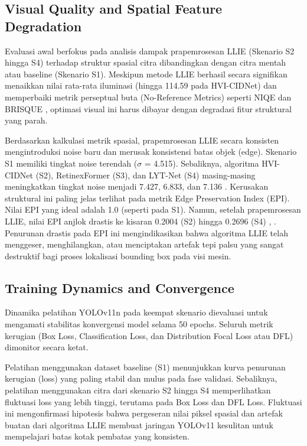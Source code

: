 ﻿\documentclass[conference]{IEEEtran}
\begin{document}
\subsection{Visual Quality and Spatial Feature Degradation} Evaluasi awal berfokus pada analisis dampak prapemrosesan LLIE (Skenario S2 hingga S4) terhadap struktur spasial citra dibandingkan dengan citra mentah atau baseline (Skenario S1). Meskipun metode LLIE berhasil secara signifikan menaikkan nilai rata-rata iluminasi (hingga 114.59 pada HVI-CIDNet) dan memperbaiki metrik perseptual buta (No-Reference Metrics) seperti NIQE dan BRISQUE \cite{report2026internal}, optimasi visual ini harus dibayar dengan degradasi fitur struktural yang parah.

Berdasarkan kalkulasi metrik spasial, prapemrosesan LLIE secara konsisten mengintroduksi noise baru dan merusak konsistensi batas objek (edge). Skenario S1 memiliki tingkat noise terendah ($\sigma$ = 4.515). Sebaliknya, algoritma HVI-CIDNet (S2), RetinexFormer (S3), dan LYT-Net (S4) masing-masing meningkatkan tingkat noise menjadi 7.427, 6.833, dan 7.136 \cite{report2026internal}. Kerusakan struktural ini paling jelas terlihat pada metrik Edge Preservation Index (EPI). Nilai EPI yang ideal adalah 1.0 (seperti pada S1). Namun, setelah prapemrosesan LLIE, nilai EPI anjlok drastis ke kisaran 0.2004 (S2) hingga 0.2696 (S4) \cite{report2026internal}, \cite{metrics2026formulas}. Penurunan drastis pada EPI ini mengindikasikan bahwa algoritma LLIE telah menggeser, menghilangkan, atau menciptakan artefak tepi palsu yang sangat destruktif bagi proses lokalisasi bounding box pada visi mesin.


\subsection{Training Dynamics and Convergence} Dinamika pelatihan YOLOv11n pada keempat skenario dievaluasi untuk mengamati stabilitas konvergensi model selama 50 epochs. Seluruh metrik kerugian (Box Loss, Classification Loss, dan Distribution Focal Loss atau DFL) dimonitor secara ketat.

Pelatihan menggunakan dataset baseline (S1) menunjukkan kurva penurunan kerugian (loss) yang paling stabil dan mulus pada fase validasi. Sebaliknya, pelatihan menggunakan citra dari skenario S2 hingga S4 memperlihatkan fluktuasi loss yang lebih tinggi, terutama pada Box Loss dan DFL Loss. Fluktuasi ini mengonfirmasi hipotesis bahwa pergeseran nilai piksel spasial dan artefak buatan dari algoritma LLIE membuat jaringan YOLOv11 kesulitan untuk mempelajari batas kotak pembatas yang konsisten.
\end{document}
